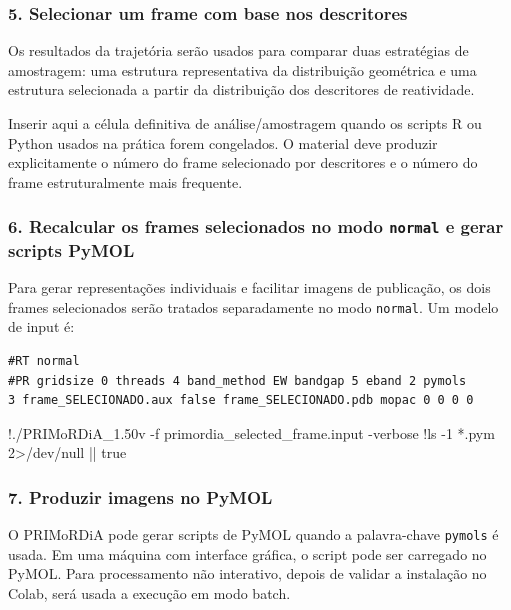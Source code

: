 \documentclass[a4paper,11pt]{refart}
\newcommand{\code}[1]{\texttt{#1}}
\begin{document}
\subsubsection{5. Selecionar um frame com base nos descritores}

Os resultados da trajetória serão usados para comparar duas estratégias de amostragem: uma estrutura representativa da distribuição geométrica e uma estrutura selecionada a partir da distribuição dos descritores de reatividade.

\begin{todobox}
Inserir aqui a célula definitiva de análise/amostragem quando os scripts R ou Python usados na prática forem congelados. O material deve produzir explicitamente o número do frame selecionado por descritores e o número do frame estruturalmente mais frequente.
\end{todobox}

\subsubsection{6. Recalcular os frames selecionados no modo \texttt{normal} e gerar scripts PyMOL}

Para gerar representações individuais e facilitar imagens de publicação, os dois frames selecionados serão tratados separadamente no modo \code{normal}. Um modelo de input é:

\begin{lstlisting}[caption={Modelo de input normal para um frame selecionado},label={primordia_selected_frame}]
#RT normal
#PR gridsize 0 threads 4 band_method EW bandgap 5 eband 2 pymols
3 frame_SELECIONADO.aux false frame_SELECIONADO.pdb mopac 0 0 0 0
\end{lstlisting}

\begin{shell}
!./PRIMoRDiA_1.50v -f primordia_selected_frame.input -verbose
!ls -1 *.pym 2>/dev/null || true
\end{shell}

\subsubsection{7. Produzir imagens no PyMOL}

O PRIMoRDiA pode gerar scripts de PyMOL quando a palavra-chave \code{pymols} é usada. Em uma máquina com interface gráfica, o script pode ser carregado no PyMOL. Para processamento não interativo, depois de validar a instalação no Colab, será usada a execução em modo batch.
\end{document}
